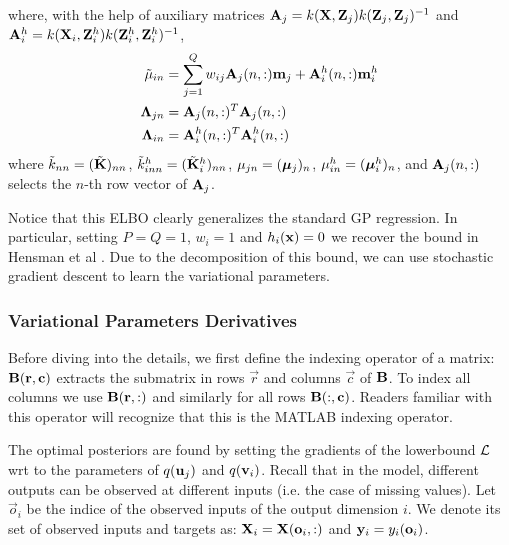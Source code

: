 where, with the help of auxiliary matrices $\mathbf{A}_j = k(\mathbf{X},\mathbf{Z}_j)k(\mathbf{Z}_j,\mathbf{Z}_j)^{-1}$ and  $\mathbf{A}^h_i = k(\mathbf{X}_i,\mathbf{Z}^h_i)k(\mathbf{Z}^h_i,\mathbf{Z}^h_i)^{-1}$, 
\begin{align}
\tilde{\mu}_{in}
&= \sum_{j=1}^Q w_{ij} \mathbf{A}_j(n,:) \mathbf{m}_j + \mathbf{A}^h_i(n,:) \mathbf{m}^h_i \\
\mathbf{\Lambda}_{jn}
&= \mathbf{A}_j(n,:)^T \mathbf{A}_j(n,:)  \\
\mathbf{\Lambda}_{in}
&= \mathbf{A}^h_i(n,:)^T \mathbf{A}^h_i(n,:) 
\end{align}
where $\tilde{k}_{nn} = (\tilde{\mathbf{K}})_{nn}$, $\tilde{k}^h_{inn} = (\tilde{\mathbf{K}}^h_i)_{nn}$, $\mu_{jn} = (\boldsymbol{\mu}_j)_n$,  $\mu^h_{in} = (\boldsymbol{\mu}^h_i)_n$, and $\mathbf{A}_j(n,:)$ selects the $n$-th row vector of $\mathbf{A}_j$.

\noindent Notice that this ELBO clearly generalizes the standard GP regression. In particular, setting $P = Q = 1$, $w_i = 1$ and $h_i(\mathbf{x}) = 0$ we recover the bound in Hensman et al \citet{hensmangaussian}.
Due to the decomposition of this bound, we can use stochastic gradient descent to learn the variational parameters.

\subsubsection{Variational Parameters Derivatives}
\newcommand{\oi}{\vec{o}_i}
Before diving into the details, we first define the indexing operator of a matrix: $\mathbf{B}(\mathbf{r},\mathbf{c})$ extracts the submatrix in rows $\vec{r}$ and columns $\vec{c}$ of $\mathbf{B}$.
To index all columns we use $\mathbf{B}(\mathbf{r},:)$ and similarly for all rows $\mathbf{B}(:,\mathbf{c})$.
Readers familiar with this operator will recognize that this is the MATLAB indexing operator.

The optimal posteriors are found by setting the gradients of the lowerbound $\mathcal{L}$ wrt to the parameters of $q(\mathbf{u}_j)$ and $q(\mathbf{v}_i)$.
Recall that in the model, different outputs can be observed at different inputs (i.e. the case of missing values).
Let $\oi$ be the indice of the observed inputs of the output dimension $i$.
We denote its set of observed inputs and targets as: $\X_i = \X(\oi,:)$ and $\y_i = y_{i}(\oi)$.

